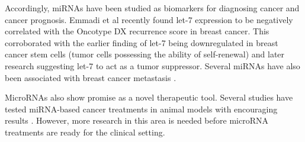 Accordingly, miRNAs have been studied as biomarkers for diagnosing cancer and
cancer prognosis. Emmadi et al \citep{Emmadi2015} recently found let-7 expression to be negatively
correlated with the Oncotype DX recurrence score in breast cancer.
This corroborated with the earlier finding of let-7 being
downregulated in breast cancer stem cells (tumor cells possessing the ability
of self-renewal) \citep{Yu2007} and later research suggesting let-7 to act as
a tumor suppressor. Several miRNAs have also been associated with breast cancer
metastasis \citep{Chen2016}.

MicroRNAs also show promise as a novel therapeutic tool. Several studies have
tested miRNA-based cancer treatments in animal models with encouraging 
results \citep{VanRooij2014}. However, more research in this area is needed
before microRNA treatments are ready for the clinical setting.


